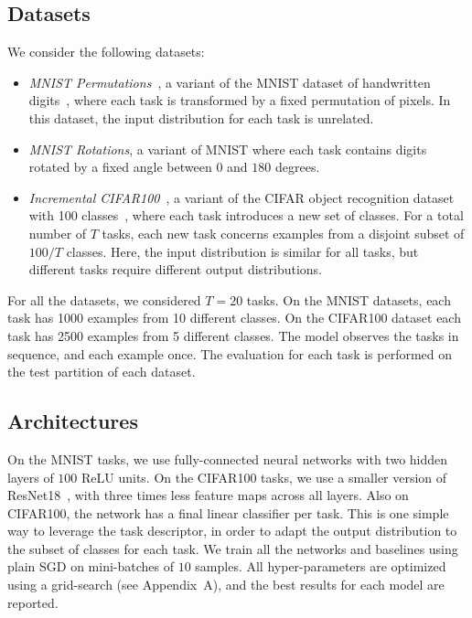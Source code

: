 \documentclass{article}
\begin{document}
\subsection{Datasets}
We consider the following datasets:
\begin{itemize}
  \item {\em MNIST Permutations}~\citep{ewc}, a variant of the MNIST
  dataset of handwritten digits~\citep{mnist}, where each task is transformed 
  by a fixed permutation of pixels. In this dataset, the input distribution
  for each task is unrelated.
  \item {\em MNIST Rotations}, a variant of MNIST where each task contains digits
  rotated by a fixed angle between $0$ and $180$ degrees.
  \item {\em Incremental CIFAR100}~\citep{icarl}, a variant of the CIFAR object
  recognition dataset with 100 classes~\citep{cifar100}, where each task
  introduces a new set of classes. For a total number of $T$ tasks, each new
  task concerns examples from a disjoint subset of $100/T$ classes. Here, the
  input distribution is similar for all tasks, but different tasks require 
  different output distributions.
\end{itemize}

For all the datasets, we considered $T=20$ tasks. On the MNIST datasets, each
task has 1000 examples from 10 different classes. On the CIFAR100 dataset
each task has 2500 examples from 5 different classes.  The model observes the
tasks in sequence, and each example once. The evaluation for each task is
performed on the test partition of each dataset. 

\subsection{Architectures}
On the MNIST tasks, we use fully-connected neural networks with two hidden
layers of $100$ ReLU units.  On the CIFAR100 tasks, we use a smaller version of
ResNet18~\citep{resnet}, with three times less feature maps across all layers.
Also on CIFAR100, the network has a final linear classifier per task.
This is one simple way to leverage the task descriptor, in order to adapt the
output distribution to the subset of classes for each task.  We train all the
networks and baselines using plain SGD on mini-batches of $10$ samples. All
hyper-parameters are optimized using a grid-search (see
Appendix~A), and the best results for each model are reported.
\end{document}
